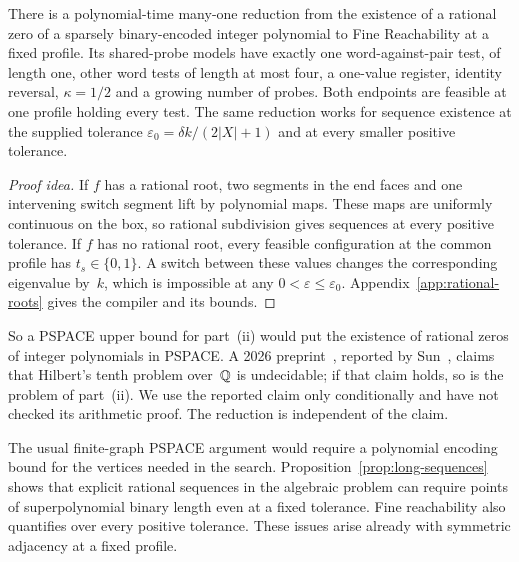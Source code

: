 \begin{theorem}\label{thm:rational-roots}
There is a polynomial-time many-one reduction from the existence of a
rational zero of a sparsely binary-encoded integer polynomial to Fine
Reachability at a fixed profile. Its shared-probe models have exactly one
word-against-pair test, of length one, other word tests of length at most
four, a one-value register, identity reversal, $\kappa=1/2$ and a growing
number of probes. Both endpoints are feasible at one profile holding every
test. The same reduction works for sequence
existence at the supplied tolerance $\varepsilon_0=\delta k/(2|X|+1)$ and
at every smaller positive tolerance.
\end{theorem}

\begin{proof}[Proof idea]
If $f$ has a rational root, two segments in the end faces and one
intervening switch segment lift by polynomial maps. These maps are
uniformly continuous on the box, so rational subdivision gives sequences at
every positive tolerance. If $f$ has no rational root, every feasible
configuration at the common profile has $t_s\in\{0,1\}$. A switch between
these values changes the corresponding eigenvalue by~$k$, which is
impossible at any $0<\varepsilon\le\varepsilon_0$. Appendix~\ref{app:rational-roots} gives
the compiler and its bounds.
\end{proof}

So a PSPACE upper bound for part~(ii) would put the existence of rational
zeros of integer polynomials in PSPACE.
A 2026 preprint~\cite{openaih10q}, reported by Sun~\cite[Section~1]{sun},
claims that Hilbert's tenth problem over~$\mathbb{Q}$ is undecidable; if that
claim holds, so is the problem of part~(ii). We use the reported claim only
conditionally and have not checked its arithmetic proof. The reduction is
independent of the claim.

The usual finite-graph PSPACE argument would require a polynomial encoding
bound for the vertices needed in the search.
Proposition~\ref{prop:long-sequences} shows that explicit rational sequences
in the algebraic problem can require points of superpolynomial binary
length even at a fixed tolerance. Fine reachability also quantifies over
every positive tolerance. These issues arise already with symmetric
adjacency at a fixed profile.

